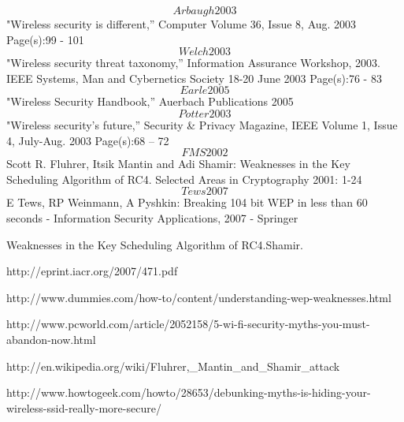 \documentclass[a4paper,12pt,pagesize,headsepline,bibtotoc,titlepage]{scrartcl}
\begin{document}
\[Arbaugh2003\] "Wireless security is different,” Computer Volume 36, Issue 8, Aug. 2003 Page(s):99 - 101\\
\[Welch2003\] "Wireless security threat taxonomy,” Information Assurance Workshop, 2003. IEEE Systems, Man and Cybernetics Society 18-20 June 2003 Page(s):76 - 83\\
\[Earle2005\] "Wireless Security Handbook,” Auerbach Publications 2005\\
\[Potter2003\] "Wireless security's future,” Security \& Privacy Magazine, IEEE Volume 1, Issue 4, July-Aug. 2003 Page(s):68 – 72\\
\[FMS2002\] Scott R. Fluhrer, Itsik Mantin and Adi Shamir: Weaknesses in the Key Scheduling Algorithm of RC4. Selected Areas in Cryptography 2001: 1-24\\
\[Tews2007\] E Tews, RP Weinmann, A Pyshkin: Breaking 104 bit WEP in less than 60 seconds - Information Security Applications, 2007 - Springer\\

\begin{thebibliography}{1}

 Weaknesses in the Key Scheduling Algorithm of RC4.Shamir.

http://eprint.iacr.org/2007/471.pdf

http://www.dummies.com/how-to/content/understanding-wep-weaknesses.html

http://www.pcworld.com/article/2052158/5-wi-fi-security-myths-you-must-abandon-now.html

http://en.wikipedia.org/wiki/Fluhrer,_Mantin_and_Shamir_attack

http://www.howtogeek.com/howto/28653/debunking-myths-is-hiding-your-wireless-ssid-really-more-secure/


\end{thebibliography}
\end{document}

